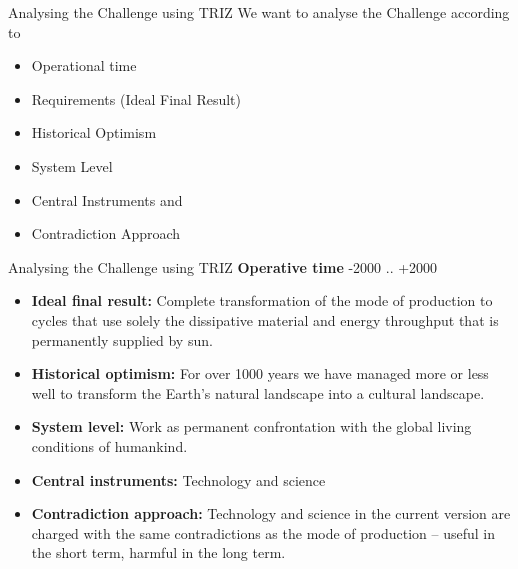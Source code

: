 \documentclass{beamer}
\begin{document}
\begin{frame}{Analysing the Challenge using TRIZ}
We want to analyse the Challenge according to
\begin{itemize}
  \item Operational time
  \item Requirements (Ideal Final Result)
  \item Historical Optimism
  \item System Level
  \item Central Instruments and
  \item Contradiction Approach
\end{itemize}
\end{frame}

\begin{frame}{Analysing the Challenge using TRIZ}
  \textbf{Operative time} -2000 .. +2000
  \begin{itemize}
  \item \textbf{Ideal final result:} Complete transformation of the mode of
    production to cycles that use solely the dissipative material and energy
    throughput that is permanently supplied by sun.
  \item \textbf{Historical optimism:} For over 1000 years we have managed more
    or less well to transform the Earth's natural landscape into a cultural
    landscape.
  \item \textbf{System level:} Work as permanent confrontation with the global
    living conditions of humankind.
  \item \textbf{Central instruments:} Technology and science
  \item \textbf{Contradiction approach:} Technology and science in the current
    version are charged with the same contradictions as the mode of production
    -- useful in the short term, harmful in the long term.
  \end{itemize}
\end{frame}
\end{document}
